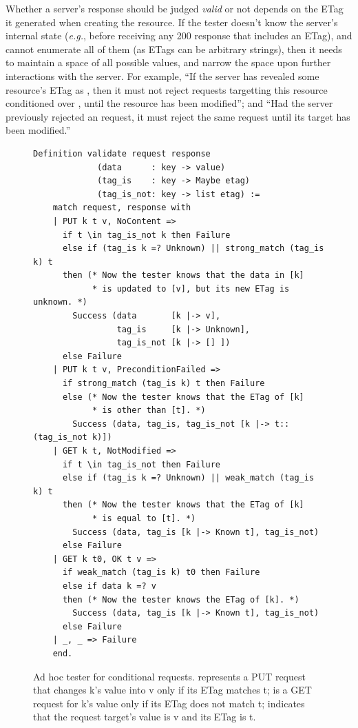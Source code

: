 Whether a server's response should be judged {\em valid} or not depends on the
ETag it generated when creating the resource.  If the tester doesn't know the
server's internal state ({\it e.g.}, before receiving any 200 response that
includes an ETag), and cannot enumerate all of them (as ETags can be arbitrary
strings), then it needs to maintain a space of all possible values, and narrow
the space upon further interactions with the server.  For example, ``If the
server has revealed some resource's ETag as , then it must
not reject requests targetting this resource conditioned over , until the resource has been modified''; and ``Had the server
previously rejected an  request, it must reject the same
request until its target has been modified.''

\begin{figure}
\begin{lstlisting}[style=customcoq]
  Definition validate request response
             (data      : key -> value)
             (tag_is    : key -> Maybe etag)
             (tag_is_not: key -> list etag) :=
    match request, response with
    | PUT k t v, NoContent => 
      if t \in tag_is_not k then Failure
      else if (tag_is k =? Unknown) || strong_match (tag_is k) t
      then (* Now the tester knows that the data in [k]
            * is updated to [v], but its new ETag is unknown. *)
        Success (data       [k |-> v],
                 tag_is     [k |-> Unknown],
                 tag_is_not [k |-> [] ])
      else Failure
    | PUT k t v, PreconditionFailed =>
      if strong_match (tag_is k) t then Failure
      else (* Now the tester knows that the ETag of [k]
            * is other than [t]. *)
        Success (data, tag_is, tag_is_not [k |-> t::(tag_is_not k)])
    | GET k t, NotModified =>
      if t \in tag_is_not then Failure
      else if (tag_is k =? Unknown) || weak_match (tag_is k) t
      then (* Now the tester knows that the ETag of [k]
            * is equal to [t]. *)
        Success (data, tag_is [k |-> Known t], tag_is_not)
      else Failure
    | GET k t0, OK t v =>
      if weak_match (tag_is k) t0 then Failure
      else if data k =? v
      then (* Now the tester knows the ETag of [k]. *)
        Success (data, tag_is [k |-> Known t], tag_is_not)
      else Failure
    | _, _ => Failure
    end.
\end{lstlisting}
  \caption[Ad hoc tester for \http conditional requests.]{Ad hoc tester for
    \http conditional requests.   represents a PUT request that
    changes \ilc k's value into \ilc v only if its ETag matches \ilc t;  is a GET request for \ilc k's value only if its ETag does not match
    \ilc t;  indicates that the request target's value is \ilc v and
    its ETag is \ilc t.}
  \label{fig:etag-tester}
\end{figure}

